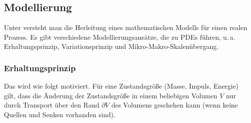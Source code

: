 \subsection{%
    Modellierung%
}

\begin{Bem}
    Unter  versteht man die Herleitung eines mathematischen Modells für einen
    realen Prozess.
    Es gibt verschiedene Modellierungsansätze, die zu PDEs führen,
    u.\,a. Erhaltungsprinzip, Variationsprinzip und Mikro-Makro-Skalenübergang.
\end{Bem}

\subsubsection{%
    Erhaltungsprinzip%
}

\begin{Bem}
    Das  wird wie folgt motiviert.
    Für eine Zustandsgröße (Masse, Impuls, Energie) gilt, dass die Änderung der Zustandsgröße
    in einem beliebigen Volumen $V$ nur durch Transport über den Rand $\partial V$ des Volumens
    geschehen kann (wenn keine Quellen und Senken vorhanden sind).
\end{Bem}

\linie


